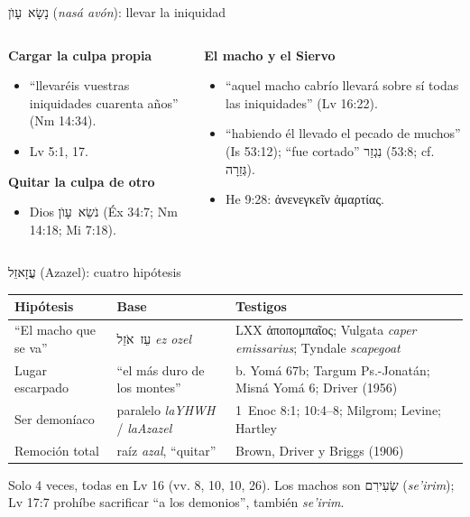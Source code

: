 \documentclass[hyperref={bookmarks=false},aspectratio=169]{beamer}
\newcommand{\heb}[1]{\mbox{\foreignlanguage{hebrew}{#1}}}
\newcommand{\grc}[1]{\foreignlanguage{ancientgreek}{#1}}
\newcommand{\destacar}[1]{\textbf{\textcolor{tierraroja}{#1}}}
\begin{document}
\begin{frame}{\heb{נָשָׂא עָוֺן} (\emph{nasá avón}): llevar la iniquidad}
\begin{columns}[t,onlytextwidth]
\begin{column}{0.49\textwidth}\small
\destacar{Cargar la culpa propia}
\begin{itemize}
\item ``llevaréis vuestras iniquidades cuarenta años'' (Nm 14:34).
\item Lv 5:1, 17.
\end{itemize}
\destacar{Quitar la culpa de otro}
\begin{itemize}
\item Dios \heb{נֹשֵׂא עָוֺן} (Éx 34:7; Nm 14:18; Mi 7:18).
\end{itemize}
\end{column}
\begin{column}{0.49\textwidth}\small
\destacar{El macho y el Siervo}
\begin{itemize}
\item ``aquel macho cabrío llevará sobre sí todas las iniquidades'' (Lv 16:22).
\item ``habiendo él llevado el pecado de muchos'' (Is 53:12); ``fue cortado'' \heb{נִגְזַר} (53:8; cf. \heb{גְּזֵרָה}).
\item He 9:28: \grc{ἀνενεγκεῖν ἁμαρτίας}.
\end{itemize}
\end{column}
\end{columns}
\end{frame}

\begin{frame}{\heb{עֲזָאזֵל} (Azazel): cuatro hipótesis}
\scriptsize\renewcommand{\arraystretch}{1.18}
\begin{tabular}{@{}L{2.9cm}L{4.6cm}L{4.0cm}@{}}
\toprule
\textbf{Hipótesis} & \textbf{Base} & \textbf{Testigos} \\ \midrule
``El macho que se va'' & \heb{עֵז אֹזֵל} \emph{ez ozel} & LXX \grc{ἀποπομπαῖος}; Vulgata \emph{caper emissarius}; Tyndale \emph{scapegoat} \\
Lugar escarpado & ``el más duro de los montes'' & b. Yomá 67b; Targum Ps.-Jonatán; Misná Yomá 6; Driver (1956) \\
Ser demoníaco & paralelo \emph{laYHWH} / \emph{laAzazel} & 1~Enoc 8:1; 10:4--8; Milgrom; Levine; Hartley \\
Remoción total & raíz \emph{azal}, ``quitar'' & Brown, Driver y Briggs (1906) \\
\bottomrule
\end{tabular}\par\medskip
\small Solo 4 veces, todas en Lv 16 (vv. 8, 10, 10, 26). Los machos son \heb{שְׂעִירִם} (\emph{se'irim}); Lv 17:7 prohíbe sacrificar ``a los demonios'', también \emph{se'irim}.
\end{frame}
\end{document}
